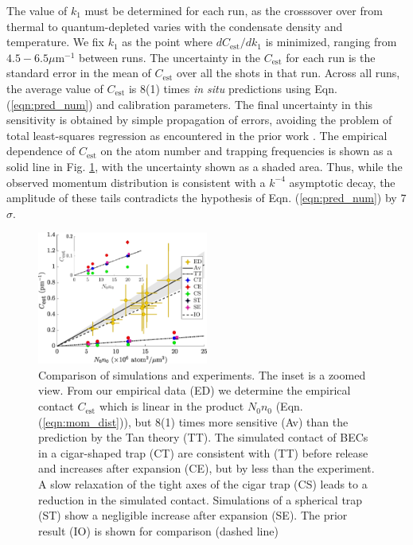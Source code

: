 The value of $k_1$ must be determined for each run, as the crosssover over from thermal to quantum-depleted varies with the condensate density and temperature. We fix $k_1$ as the point where $dC_\textrm{est}/dk_1$ is minimized, ranging from $4.5-6.5\mu\textrm{m}^{-1}$ between runs. The uncertainty in the $C_\textrm{est}$ for each run is the standard error in the mean of $C_\textrm{est}$ over all the shots in that run. Across all runs, the average value of $C_\textrm{est}$ is 8(1) times \textit{in situ} predictions using Eqn. (\ref{eqn:pred_num}) and calibration parameters. The final uncertainty in this sensitivity is obtained by simple propagation of errors, avoiding the problem of total least-squares regression as encountered in the prior work \cite{chang16}. The empirical dependence of $C_\textrm{est}$ on the atom number and trapping frequencies is shown as a solid line in Fig. \ref{fig:results_comp}, with the uncertainty shown as a shaded area. Thus, while the observed momentum distribution is consistent with a $k^{-4}$ asymptotic decay, the amplitude of these tails contradicts the hypothesis of Eqn. (\ref{eqn:pred_num}) by 7$\sigma$.

    
	\begin{figure}[t]
	        \includegraphics[width=0.5\textwidth]{fig/QD/results_comp}
	        \caption{Comparison of simulations and experiments. The inset is a zoomed view.  From our empirical data (ED) we determine the empirical contact $C_\textrm{est}$ which is linear in the product $N_0n_0$ (Eqn. (\ref{eqn:mom_dist})), but 8(1) times more sensitive (Av) than the prediction by the Tan theory (TT). The simulated contact of BECs in a cigar-shaped trap (CT) are consistent with (TT) before release and increases after expansion (CE), but by less than the experiment. A slow relaxation of the tight axes of the cigar trap (CS) leads to a reduction in the simulated contact. Simulations of a spherical trap (ST) show a negligible increase after expansion (SE). The prior \mhe result \cite{chang16} (IO) is shown for comparison (dashed line)}
	        \label{fig:results_comp}
	\end{figure}


